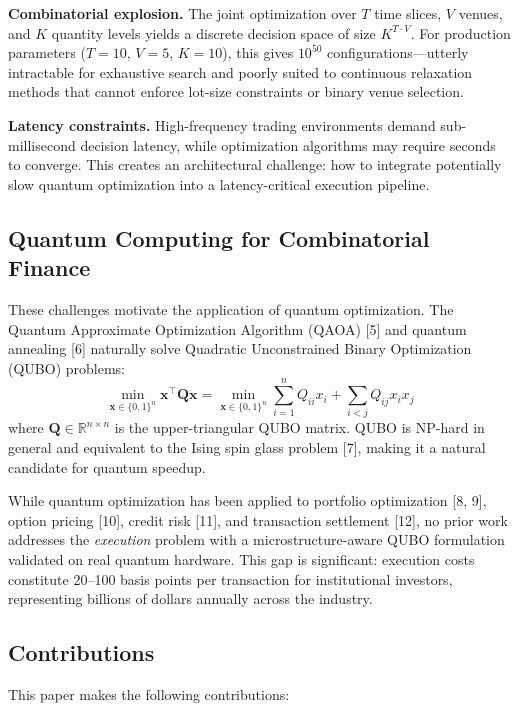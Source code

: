 \documentclass[11pt]{article}
\newcommand{\bx}{\mathbf{x}}
\newcommand{\bQ}{\mathbf{Q}}
\newcommand{\R}{\mathbb{R}}
\begin{document}
\textbf{Combinatorial explosion.} The joint optimization over $T$ time slices, $V$ venues, and $K$ quantity levels yields a discrete decision space of size $K^{T \cdot V}$. For production parameters ($T=10$, $V=5$, $K=10$), this gives $10^{50}$ configurations---utterly intractable for exhaustive search and poorly suited to continuous relaxation methods that cannot enforce lot-size constraints or binary venue selection.

\textbf{Latency constraints.} High-frequency trading environments demand sub-millisecond decision latency, while optimization algorithms may require seconds to converge. This creates an architectural challenge: how to integrate potentially slow quantum optimization into a latency-critical execution pipeline.

\subsection{Quantum Computing for Combinatorial Finance}

These challenges motivate the application of quantum optimization. The Quantum Approximate Optimization Algorithm (QAOA) [5] and quantum annealing [6] naturally solve Quadratic Unconstrained Binary Optimization (QUBO) problems:
\begin{equation}
\min_{\bx \in \{0,1\}^n} \bx^\top \bQ \bx = \min_{\bx \in \{0,1\}^n} \sum_{i=1}^n Q_{ii} x_i + \sum_{i<j} Q_{ij} x_i x_j
\label{eq:qubo_general}
\end{equation}
where $\bQ \in \R^{n \times n}$ is the upper-triangular QUBO matrix. QUBO is NP-hard in general and equivalent to the Ising spin glass problem [7], making it a natural candidate for quantum speedup.

While quantum optimization has been applied to portfolio optimization [8, 9], option pricing [10], credit risk [11], and transaction settlement [12], no prior work addresses the \emph{execution} problem with a microstructure-aware QUBO formulation validated on real quantum hardware. This gap is significant: execution costs constitute 20--100 basis points per transaction for institutional investors, representing billions of dollars annually across the industry.

\subsection{Contributions}

This paper makes the following contributions:
\end{document}
